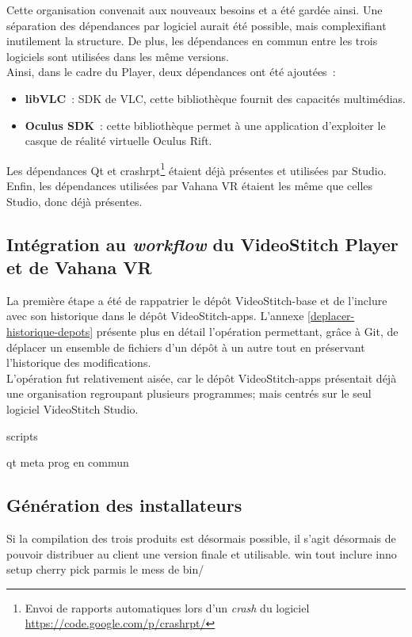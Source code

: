 Cette organisation convenait aux nouveaux besoins et a été gardée ainsi. Une séparation
des dépendances par logiciel aurait été possible, mais complexifiant inutilement 
la structure. De plus, les dépendances en commun entre les trois logiciels
sont utilisées dans les même versions. \\
\newline
Ainsi, dans le cadre du Player, deux dépendances ont été ajoutées~:
\begin{itemize}
  \item \textbf{libVLC}~: SDK de VLC, cette bibliothèque fournit des capacités multimédias.\cite{libvlc}
  \item \textbf{Oculus SDK}~: cette bibliothèque permet à une application d'exploiter le 
  casque de réalité virtuelle Oculus Rift.\cite{oculus-developer-guide}
\end{itemize}
Les dépendances Qt et crashrpt\footnote{Envoi de rapports automatiques lors d'un
\textit{crash} du logiciel \url{https://code.google.com/p/crashrpt/}} étaient déjà 
présentes et utilisées par Studio.\\
Enfin, les dépendances utilisées par Vahana VR étaient les même que celles Studio,
donc déjà présentes.

\subsection{Intégration au \textit{workflow} du VideoStitch Player et de Vahana VR}
La première étape a été de rappatrier le dépôt VideoStitch-base et de l'inclure
avec son historique dans le dépôt VideoStitch-apps. L'annexe \ref{deplacer-historique-depots}
présente plus en détail l'opération permettant, grâce à Git, de déplacer un ensemble 
de fichiers d'un dépôt à un autre tout en préservant l'historique des modifications.\\
\newline
L'opération fut relativement aisée, car le dépôt VideoStitch-apps présentait déjà
une organisation regroupant plusieurs programmes; mais centrés sur le seul logiciel
VideoStitch Studio.

scripts

qt meta prog en commun

\subsection{Génération des installateurs}
Si la compilation des trois produits est désormais possible, il s'agit désormais
de pouvoir distribuer au client une version finale et utilisable.
win tout inclure inno setup cherry pick parmis le mess de bin/

